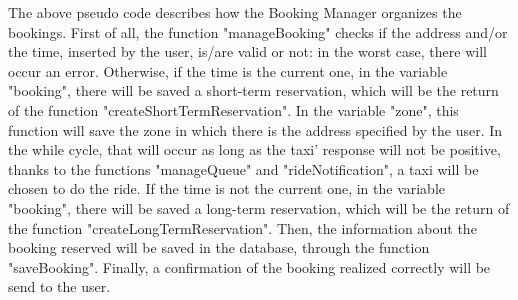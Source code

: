 \vspace{0.5cm}

The above pseudo code describes how the Booking Manager organizes the bookings. 
First of all, the function "manageBooking" checks if the address and/or the time, inserted by the user, is/are valid or not: in the worst case, there will occur an error. 
Otherwise, if the time is the current one, in the variable "booking", there will be saved a short-term reservation, which will be the return of the function "createShortTermReservation". In the variable "zone", this function will save the zone in which there is the address specified by the user. 
In the while cycle, that will occur as long as the taxi' response will not be positive, thanks to the functions "manageQueue" and "rideNotification", a taxi will be chosen to do the ride. 
If the time is not the current one, in the variable "booking", there will be saved a long-term reservation, which will be the return of the function "createLongTermReservation".
Then, the information about the booking reserved will be saved in the database, through the function "saveBooking".
Finally, a confirmation of the booking realized correctly will be send to the user.